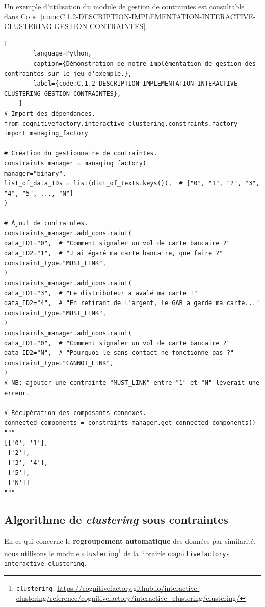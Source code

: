 	Un exemple d'utilisation du module de gestion de contraintes est consultable dans \textsc{Code~\ref{code:C.1.2-DESCRIPTION-IMPLEMENTATION-INTERACTIVE-CLUSTERING-GESTION-CONTRAINTES}}.
	
	\begin{lstlisting}[
		language=Python,
		caption={Démonstration de notre implémentation de gestion des contraintes sur le jeu d'exemple.},
		label={code:C.1.2-DESCRIPTION-IMPLEMENTATION-INTERACTIVE-CLUSTERING-GESTION-CONTRAINTES},
	]
# Import des dépendances.
from cognitivefactory.interactive_clustering.constraints.factory import managing_factory

# Création du gestionnaire de contraintes.
constraints_manager = managing_factory(
manager="binary",
list_of_data_IDs = list(dict_of_texts.keys()),  # ["0", "1", "2", "3", "4", "5", ..., "N"]
)

# Ajout de contraintes.
constraints_manager.add_constraint(
data_ID1="0",  # "Comment signaler un vol de carte bancaire ?"
data_ID2="1",  # "J'ai égaré ma carte bancaire, que faire ?"
constraint_type="MUST_LINK",
)
constraints_manager.add_constraint(
data_ID1="3",  # "Le distributeur a avalé ma carte !"
data_ID2="4",  # "En retirant de l'argent, le GAB a gardé ma carte..."
constraint_type="MUST_LINK",
)
constraints_manager.add_constraint(
data_ID1="0",  # "Comment signaler un vol de carte bancaire ?"
data_ID2="N",  # "Pourquoi le sans contact ne fonctionne pas ?"
constraint_type="CANNOT_LINK",
)
# NB: ajouter une contrainte "MUST_LINK" entre "1" et "N" lèverait une erreur.

# Récupération des composants connexes.
connected_components = constraints_manager.get_connected_components()
"""
[['0', '1'],
 ['2'],
 ['3', '4'],
 ['5'],
 ['N']]
"""
	\end{lstlisting}
	
	
	\subsection{Algorithme de \textit{clustering} sous contraintes}
	\label{section:C.1.3-DESCRIPTION-IMPLEMENTATION-INTERACTIVE-CLUSTERING-ALGORITHMES-CLUSTERING-SOUS-CONTRAINTES}
	
	En ce qui concerne le \textbf{regroupement automatique} des données par similarité, nous utilisons le module \texttt{clustering}\footnote{
		\texttt{clustering}: \url{https://cognitivefactory.github.io/interactive-clustering/reference/cognitivefactory/interactive_clustering/clustering/}
	} de la librairie \texttt{cognitivefactory-interactive-clustering}.
	
